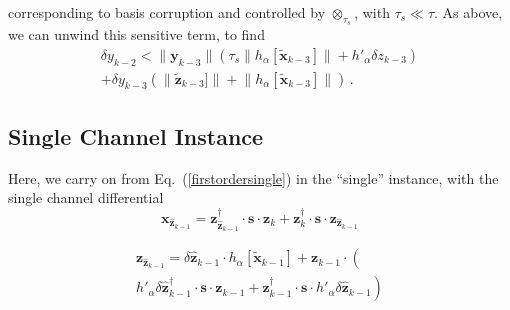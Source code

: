 \documentclass[letterpaper,twocolumn,amsmath,amsfont,amssymb,english,aps,jcp,preprintnumbers,groupaddress,nofootinbib,tightenlines,floatfix]{revtex4}
\newcommand{\mat}[1]{\boldsymbol{#1}}
\newcommand{\ots}{ {\scriptstyle \otimes}_{ \! \tau_s } }
\theoremstyle{plain}
\theoremstyle{remark}
\theoremstyle{plain}
\begin{document}

corresponding to  basis corruption and controlled by $\ots$, with $\tau_s \ll \tau$. 
As above, we can unwind this sensitive term, to find 
\begin{multline}
\delta y_{k-2} <   \lVert \mat{y}_{k-3} \rVert  \left( \tau_s \lVert h_\alpha [ \widetilde{\mat{x}}_{k-3}] \rVert + h'_\alpha \delta z_{k-3} \right )\\
+  \delta y_{k-3}  \left( \lVert \widetilde{\mat{z}}_{k-3}]  \rVert + \lVert h_\alpha [ \widetilde{\mat{x}}_{k-3}]  \rVert
  \right)
\, .
\end{multline}


\subsection{Single Channel Instance}

Here, we carry on from Eq.~(\ref{firstordersingle}) in the ``single'' instance, with the single channel differential 
\begin{equation}
 \mat{x}_{\widehat{\mat{z}}_{k-1}} =   \mat{z}^\dagger_{\widehat{\mat{z}}_{k-1}} \cdot \mat{s} \cdot \mat{z}_{k} + 
                                  \mat{z}^\dagger_k \cdot \mat{s} \cdot \mat{z}_{\widehat{\mat{z}}_{k-1}} 
\end{equation}



\begin{multline}
\mat{z}_{\widehat{\mat{z}}_{k-1} } = \delta \widehat{\mat{z}}_{k-1} \cdot h_\alpha[ \widetilde{\mat{x}}_{k-1} ] + \mat{z}_{k-1} \cdot \left( \right. \\
 \left.  h'_\alpha \delta \widehat{\mat{z}}^\dagger_{k-1} \cdot \mat{s} \cdot \mat{z}_{k-1} +  \mat{z}^\dagger_{k-1} \cdot \mat{s} \cdot h'_\alpha \delta \widehat{\mat{z}}_{k-1}
 \right) 
\end{multline}
\end{document}

